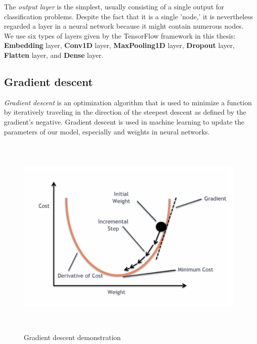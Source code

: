 The \emph{output layer} is the simplest, usually consisting of a single output for classification problems. Despite the fact that it is a single 'node,' it is nevertheless regarded a layer in a neural network because it might contain numerous nodes. We use six types of layers given by the TensorFlow framework in this thesis: \textbf{Embedding} layer, \textbf{Conv1D} layer, \textbf{MaxPooling1D} layer, \textbf{Dropout} layer, \textbf{Flatten} layer, and \textbf{Dense} layer.
\newpage
\subsection{Gradient descent}
\label{subsec:gradient_descent}
\emph{Gradient descent} is an optimization algorithm that is used to minimize a function by iteratively traveling in the direction of the steepest descent as defined by the gradient's negative. Gradient descent is used in machine learning to update the parameters of our model, especially and weights in neural networks.
\begin{figure}[!h]
	\centering
	\includegraphics[width=\linewidth, height=10cm,keepaspectratio]{figures/gradient descent.png}
   \caption{Gradient descent demonstration}
\end{figure}
